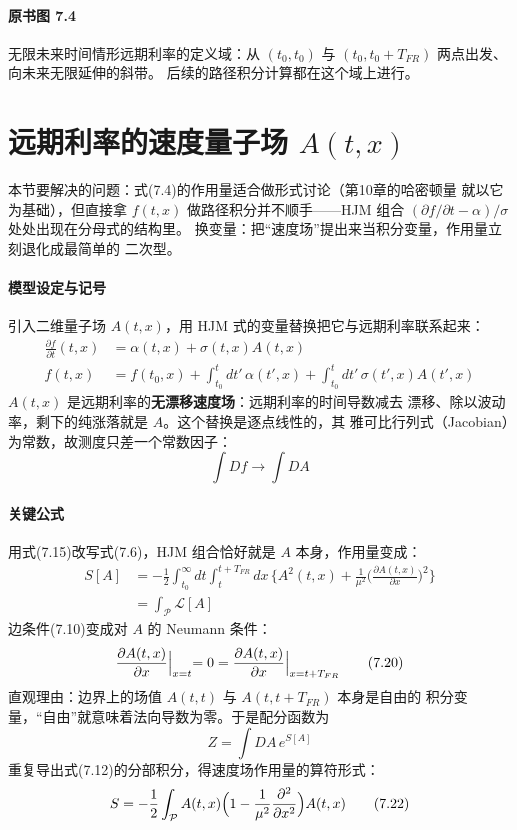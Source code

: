 \paragraph{原书图 7.4}\quad 无限未来时间情形远期利率的定义域：从
$(t_0,t_0)$ 与 $(t_0,t_0+T_{FR})$ 两点出发、向未来无限延伸的斜带。
后续的路径积分计算都在这个域上进行。

\section{远期利率的速度量子场 $A(t,x)$}

本节要解决的问题：式(7.4)的作用量适合做形式讨论（第10章的哈密顿量
就以它为基础），但直接拿 $f(t,x)$ 做路径积分并不顺手——HJM 组合
$(\partial f/\partial t-\alpha)/\sigma$ 处处出现在分母式的结构里。
换变量：把“速度场”提出来当积分变量，作用量立刻退化成最简单的
二次型。

\paragraph{模型设定与记号}
引入二维量子场 $A(t,x)$，用 HJM 式的变量替换把它与远期利率联系起来：
\begin{align*}
\frac{\partial f}{\partial t}(t,x)&=\alpha(t,x)+\sigma(t,x)A(t,x)
\tag{7.15}\\
f(t,x)&=f(t_0,x)+\int_{t_0}^{t}dt'\,\alpha(t',x)
+\int_{t_0}^{t}dt'\,\sigma(t',x)A(t',x)
\tag{7.16}
\end{align*}
$A(t,x)$ 是远期利率的\textbf{无漂移速度场}：远期利率的时间导数减去
漂移、除以波动率，剩下的纯涨落就是 $A$。这个替换是逐点线性的，其
雅可比行列式（Jacobian）为常数，故测度只差一个常数因子：
\begin{equation*}
\int Df\to\int DA
\tag{7.17}
\end{equation*}

\paragraph{关键公式}
用式(7.15)改写式(7.6)，HJM 组合恰好就是 $A$ 本身，作用量变成：
\begin{align*}
S[A]&=-\frac{1}{2}\int_{t_0}^{\infty}dt\int_{t}^{t+T_{FR}}dx\,
\biggl\{A^{2}(t,x)+\frac{1}{\mu^{2}}
\biggl(\frac{\partial A(t,x)}{\partial x}\biggr)^{2}\biggr\}
\tag{7.18}\\
&=\int_{\mathcal{P}}\mathcal{L}[A]
\tag{7.19}
\end{align*}
边条件(7.10)变成对 $A$ 的 Neumann 条件：
\begin{equation*}
\frac{\partial A(t,x)}{\partial x}\Bigl|_{x=t}=0
=\frac{\partial A(t,x)}{\partial x}\Bigr|_{x=t+T_{FR}}
\tag{7.20}
\end{equation*}
直观理由：边界上的场值 $A(t,t)$ 与 $A(t,t+T_{FR})$ 本身是自由的
积分变量，“自由”就意味着法向导数为零。于是配分函数为
\begin{equation*}
Z=\int DA\,e^{S[A]}
\tag{7.21}
\end{equation*}
重复导出式(7.12)的分部积分，得速度场作用量的算符形式：
\begin{equation*}
S=-\frac{1}{2}\int_{\mathcal{P}}A(t,x)
\Bigl(1-\frac{1}{\mu^{2}}\frac{\partial^{2}}{\partial x^{2}}\Bigr)
A(t,x)
\tag{7.22}
\end{equation*}

